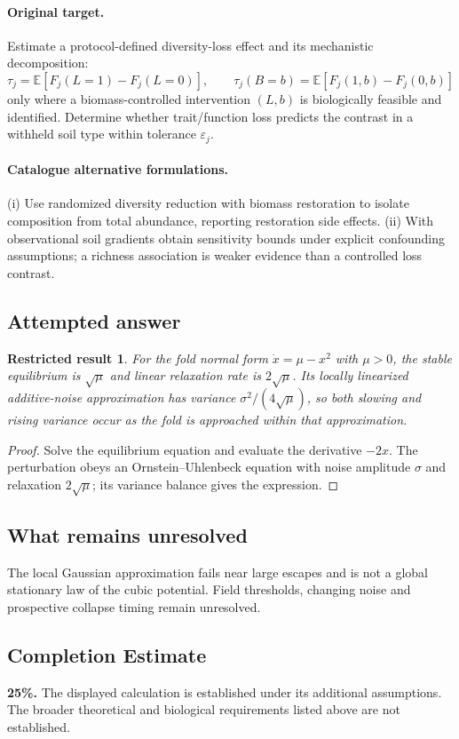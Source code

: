 \documentclass[11pt]{article}
\newcommand{\E}{\mathbb E}
\providecommand{\E}{\mathbb E}
\newtheorem{attemptresult}{Restricted result}[section]
\begin{document}
\paragraph{Original target.}
Estimate a protocol-defined diversity-loss effect and its mechanistic decomposition:
\[
 \tau_j=\E[F_j(L=1)-F_j(L=0)],\qquad
 \tau_j(B=b)=\E[F_j(1,b)-F_j(0,b)]
\]
only where a biomass-controlled intervention $(L,b)$ is biologically feasible and identified. Determine whether trait/function loss predicts the contrast in a withheld soil type within tolerance $\varepsilon_j$.
\paragraph{Catalogue alternative formulations.}
(i) Use randomized diversity reduction with biomass restoration to isolate composition from total abundance, reporting restoration side effects. (ii) With observational soil gradients obtain sensitivity bounds under explicit confounding assumptions; a richness association is weaker evidence than a controlled loss contrast.
\subsection{Attempted answer}
\begin{attemptresult}
For the fold normal form $\dot x=\mu-x^2$ with $\mu>0$, the stable equilibrium is $\sqrt\mu$ and linear relaxation rate is $2\sqrt\mu$. Its locally linearized additive-noise approximation has variance $\sigma^2/(4\sqrt\mu)$, so both slowing and rising variance occur as the fold is approached within that approximation.
\end{attemptresult}
\begin{proof}
Solve the equilibrium equation and evaluate the derivative $-2x$. The perturbation obeys an Ornstein--Uhlenbeck equation with noise amplitude $\sigma$ and relaxation $2\sqrt\mu$; its variance balance gives the expression.
\end{proof}
\subsection{What remains unresolved}
The local Gaussian approximation fails near large escapes and is not a global stationary law of the cubic potential. Field thresholds, changing noise and prospective collapse timing remain unresolved.
\subsection{Completion Estimate}
\textbf{25\%.} The displayed calculation is established under its additional assumptions. The broader theoretical and biological requirements listed above are not established.
\end{document}
